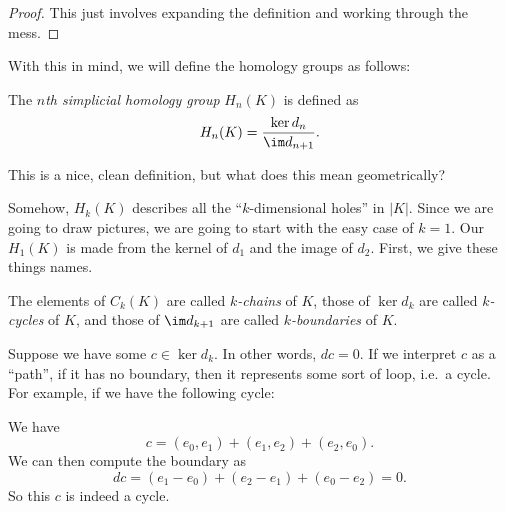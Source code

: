 \documentclass[a4paper]{article}
\begin{document}
\begin{proof}
  This just involves expanding the definition and working through the mess. %
\end{proof}

With this in mind, we will define the homology groups as follows:
\begin{defi}
  The \emph{$n$th simplicial homology group} $H_n(K)$ is defined as
  \[
    H_n(K) = \frac{\ker d_n}{\im d_{n + 1}}.
  \]
\end{defi}
This is a nice, clean definition, but what does this mean geometrically?

Somehow, $H_k(K)$ describes all the ``$k$-dimensional holes'' in $|K|$. Since we are going to draw pictures, we are going to start with the easy case of $k = 1$. Our $H_1(K)$ is made from the kernel of $d_1$ and the image of $d_2$. First, we give these things names.

\begin{defi}
  The elements of $C_k(K)$ are called \emph{$k$-chains} of $K$, those of $\ker d_k$ are called \emph{$k$-cycles} of $K$, and those of $\im d_{k + 1}$ are called \emph{$k$-boundaries} of $K$.
\end{defi}

Suppose we have some $c \in \ker d_k$. In other words, $dc = 0$. If we interpret $c$ as a ``path'', if it has no boundary, then it represents some sort of loop, i.e.\ a cycle. For example, if we have the following cycle:
\begin{center}
\end{center}
We have
\[
  c = (e_0, e_1) + (e_1, e_2) + (e_2, e_0).
\]
We can then compute the boundary as
\[
  dc = (e_1 - e_0) + (e_2 - e_1) + (e_0 - e_2) = 0.
\]
So this $c$ is indeed a cycle.
\end{document}
